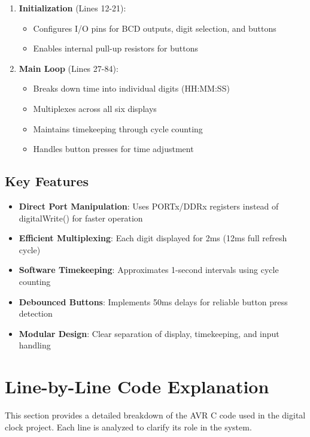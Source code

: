 \documentclass{article}
\begin{document}
\begin{enumerate}
    \item \textbf{Initialization} (Lines 12-21):
    \begin{itemize}
        \item Configures I/O pins for BCD outputs, digit selection, and buttons
        \item Enables internal pull-up resistors for buttons
    \end{itemize}
    
    \item \textbf{Main Loop} (Lines 27-84):
    \begin{itemize}
        \item Breaks down time into individual digits (HH:MM:SS)
        \item Multiplexes across all six displays
        \item Maintains timekeeping through cycle counting
        \item Handles button presses for time adjustment
    \end{itemize}
\end{enumerate}

\subsection{Key Features}
\begin{itemize}
    \item \textbf{Direct Port Manipulation}: Uses PORTx/DDRx registers instead of digitalWrite() for faster operation
    \item \textbf{Efficient Multiplexing}: Each digit displayed for 2ms (12ms full refresh cycle)
    \item \textbf{Software Timekeeping}: Approximates 1-second intervals using cycle counting
    \item \textbf{Debounced Buttons}: Implements 50ms delays for reliable button press detection
    \item \textbf{Modular Design}: Clear separation of display, timekeeping, and input handling
\end{itemize}

\section{Line-by-Line Code Explanation}
This section provides a detailed breakdown of the AVR C code used in the digital clock project. Each line is analyzed to clarify its role in the system.
\end{document}

